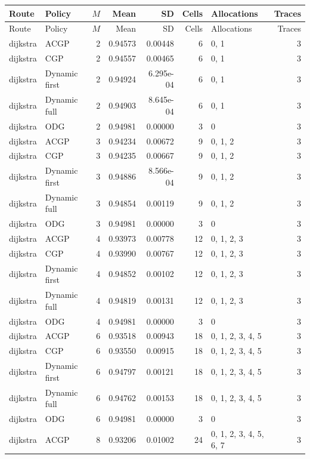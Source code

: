 \documentclass[10pt,a4paper]{article}
\begin{document}
\tiny\setlength{\tabcolsep}{2pt}\begin{longtable}{@{}p{23mm}p{29mm}rrrrp{36mm}r@{}}
\toprule Route & Policy & $M$ & Mean & SD & Cells & Allocations & Traces \\ \midrule\endfirsthead
\toprule Route & Policy & $M$ & Mean & SD & Cells & Allocations & Traces \\ \midrule\endhead
\bottomrule\endfoot
dijkstra & ACGP & 2 & 0.94573 & 0.00448 & 6 & 0, 1 & 3 \\
dijkstra & CGP & 2 & 0.94557 & 0.00465 & 6 & 0, 1 & 3 \\
dijkstra & Dynamic first & 2 & 0.94924 & 6.295e-04 & 6 & 0, 1 & 3 \\
dijkstra & Dynamic full & 2 & 0.94903 & 8.645e-04 & 6 & 0, 1 & 3 \\
dijkstra & ODG & 2 & 0.94981 & 0.00000 & 3 & 0 & 3 \\
dijkstra & ACGP & 3 & 0.94234 & 0.00672 & 9 & 0, 1, 2 & 3 \\
dijkstra & CGP & 3 & 0.94235 & 0.00667 & 9 & 0, 1, 2 & 3 \\
dijkstra & Dynamic first & 3 & 0.94886 & 8.566e-04 & 9 & 0, 1, 2 & 3 \\
dijkstra & Dynamic full & 3 & 0.94854 & 0.00119 & 9 & 0, 1, 2 & 3 \\
dijkstra & ODG & 3 & 0.94981 & 0.00000 & 3 & 0 & 3 \\
dijkstra & ACGP & 4 & 0.93973 & 0.00778 & 12 & 0, 1, 2, 3 & 3 \\
dijkstra & CGP & 4 & 0.93990 & 0.00767 & 12 & 0, 1, 2, 3 & 3 \\
dijkstra & Dynamic first & 4 & 0.94852 & 0.00102 & 12 & 0, 1, 2, 3 & 3 \\
dijkstra & Dynamic full & 4 & 0.94819 & 0.00131 & 12 & 0, 1, 2, 3 & 3 \\
dijkstra & ODG & 4 & 0.94981 & 0.00000 & 3 & 0 & 3 \\
dijkstra & ACGP & 6 & 0.93518 & 0.00943 & 18 & 0, 1, 2, 3, 4, 5 & 3 \\
dijkstra & CGP & 6 & 0.93550 & 0.00915 & 18 & 0, 1, 2, 3, 4, 5 & 3 \\
dijkstra & Dynamic first & 6 & 0.94797 & 0.00121 & 18 & 0, 1, 2, 3, 4, 5 & 3 \\
dijkstra & Dynamic full & 6 & 0.94762 & 0.00153 & 18 & 0, 1, 2, 3, 4, 5 & 3 \\
dijkstra & ODG & 6 & 0.94981 & 0.00000 & 3 & 0 & 3 \\
dijkstra & ACGP & 8 & 0.93206 & 0.01002 & 24 & 0, 1, 2, 3, 4, 5, 6, 7 & 3 \\

\end{longtable}
\end{document}

